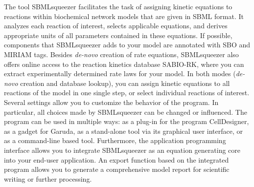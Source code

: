The tool SBMLsqueezer facilitates the task of assigning kinetic equations to
reactions within biochemical network models that are given in \acs{SBML} format.
It analyzes each reaction of interest, selects applicable equations, and derives
appropriate units of all parameters contained in these equations.
If possible, components that SBMLsqueezer adds to your model are annotated with
\ac{SBO} and \ac{MIRIAM} tags.
Besides \emph{de-novo} creation of rate equations, SBMLsqueezer also offers
online access to the reaction kinetics database \ac{SABIO-RK}, where you can extract
experimentally determined rate laws for your model.
In both modes (\emph{de-novo} creation and database lookup), you can assign kinetic equations to all reactions of the model in
one single step, or select individual reactions of interest. 
Several settings allow you to customize the behavior of the program.
In particular, all choices made by SBMLsqueezer can be changed or influenced.
The program can be used in multiple ways: as a plug-in for the program
CellDesigner, as a gadget for Garuda, as a stand-alone tool via its graphical
user interface, or as a command-line based tool.
Furthermore, the application programming interface allows you to integrate
SBMLsqueezer as an equation generating core into your end-user application.
An export function based on the integrated program \SBMLLaTeXs{} allows you to
generate a comprehensive model report for scientific writing or further
processing.
